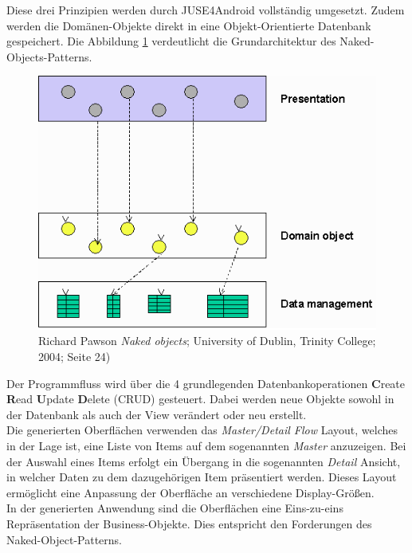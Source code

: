 \documentclass[a4paper,twoside]{article}
\begin{document}
Diese drei Prinzipien werden durch JUSE4Android vollständig umgesetzt. Zudem werden die Domänen-Objekte direkt in eine Objekt-Orientierte Datenbank gespeichert. Die Abbildung \ref{fig:Grafik3} verdeutlicht die Grundarchitektur des Naked-Objects-Patterns.\\
\begin{figure}[!h]
	\centering
	\includegraphics[scale=.5]{pics/NakedObjectPattern.png}
	\caption[Naked-Object-Pattern Architektur nach Richard Pawson, University of Dublin, Trinity College]{ Richard Pawson  \emph{\glqq Naked objects\grqq{}}; University of Dublin, Trinity College; 2004; Seite 24)}
	\label{fig:Grafik3}
\end{figure}

Der Programmfluss wird über die 4 grundlegenden Datenbankoperationen \textbf{C}reate \textbf{R}ead \textbf{U}pdate \textbf{D}elete (CRUD) gesteuert. Dabei werden neue Objekte sowohl in der Datenbank als auch der View verändert oder neu erstellt.\\ 
Die generierten Oberflächen verwenden das \textit{Master/Detail Flow} Layout, welches in der Lage ist, eine Liste von Items auf dem sogenannten \textit{Master} anzuzeigen. Bei der Auswahl eines Items erfolgt ein Übergang in die sogenannten \textit{Detail} Ansicht, in welcher Daten zu dem dazugehörigen Item präsentiert werden. Dieses Layout ermöglicht eine Anpassung der Oberfläche an verschiedene  Display-Größen.\\
In der generierten Anwendung sind die Oberflächen eine Eins-zu-eins Repräsentation der Business-Objekte. Dies entspricht den Forderungen des Naked-Object-Patterns.
\end{document}
